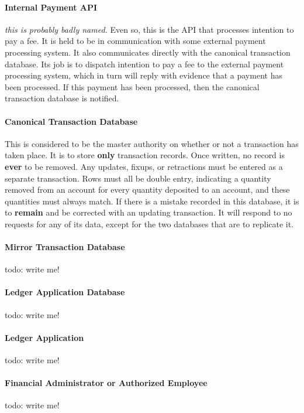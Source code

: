 \paragraph{Internal Payment API} \textit{this is probably badly named.}  Even
so, this is the API that processes intention to pay a fee.  It is held to be in
communication with some external payment processing system.  It also
communicates directly with the canonical transaction database.  Its job is to
dispatch intention to pay a fee to the external payment processing system,
which in turn will reply with evidence that a payment has been processed.  If
this payment has been processed, then the canonical transaction database is
notified.

\paragraph{Canonical Transaction Database}  This is considered to be the master
authority on whether or not a transaction has taken place.  It is to store
\textbf{only} transaction records.  Once written, no record is \textbf{ever} to
be removed.  Any updates, fixups, or retractions must be entered as a separate
transaction.  Rows must all be double entry, indicating a quantity removed from
an account for every quantity deposited to an account, and these quantities
must always match.  If there is a mistake recorded in this database, it is to
\textbf{remain} and be corrected with an updating transaction.  It will respond
to no requests for any of its data, except for the two databases that are to
replicate it.

\paragraph{Mirror Transaction Database} todo: write me!

\paragraph{Ledger Application Database} todo: write me!

\paragraph{Ledger Application} todo: write me!

\paragraph{Financial Administrator or Authorized Employee} todo: write me!
